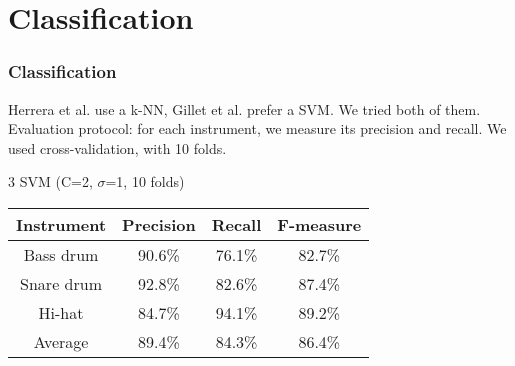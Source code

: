 \documentclass{beamer}
\begin{document}
    \section{Classification}
    \begin{frame}
        \frametitle{Classification}
        Herrera et al. use a k-NN, Gillet et al. prefer a SVM. We tried both of them.
        Evaluation protocol: for each instrument, we measure its precision and recall. We used cross-validation, with 10 folds.

        \begin{center}

3 SVM (C=2, $\sigma$=1, 10 folds)
\begin{tabular}{|c|c|c|c|}
\hline
Instrument&Precision&Recall&F-measure\\
\hline
Bass drum&90.6\%&76.1\%&82.7\%\\
\hline
Snare drum&92.8\%&82.6\%&87.4\%\\
\hline
Hi-hat&84.7\%&94.1\%&89.2\%\\
\hline
Average&89.4\%&84.3\%&86.4\%\\
\hline
\end{tabular}


\end{center}
\end{frame}
\end{document}
